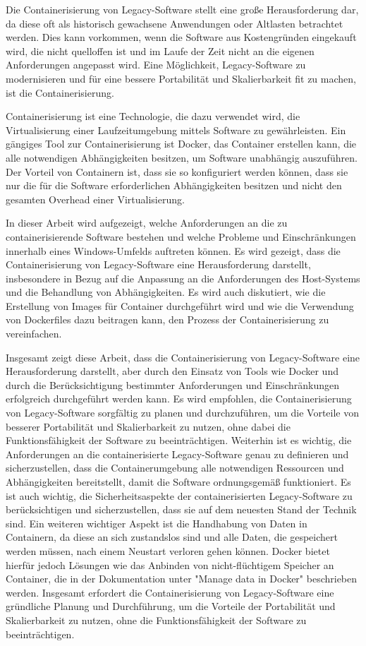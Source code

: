 Die Containerisierung von Legacy-Software stellt eine große Herausforderung dar, da diese oft als historisch gewachsene Anwendungen oder Altlasten betrachtet werden. Dies kann vorkommen, wenn die Software aus Kostengründen eingekauft wird, die nicht quelloffen ist und im Laufe der Zeit nicht an die eigenen Anforderungen angepasst wird. Eine Möglichkeit, Legacy-Software zu modernisieren und für eine bessere Portabilität und Skalierbarkeit fit zu machen, ist die Containerisierung.

Containerisierung ist eine Technologie, die dazu verwendet wird, die Virtualisierung einer Laufzeitumgebung mittels Software zu gewährleisten. Ein gängiges Tool zur Containerisierung ist Docker, das Container erstellen kann, die alle notwendigen Abhängigkeiten besitzen, um Software unabhängig auszuführen. Der Vorteil von Containern ist, dass sie so konfiguriert werden können, dass sie nur die für die Software erforderlichen Abhängigkeiten besitzen und nicht den gesamten Overhead einer Virtualisierung.

In dieser Arbeit wird aufgezeigt, welche Anforderungen an die zu containerisierende Software bestehen und welche Probleme und Einschränkungen innerhalb eines Windows-Umfelds auftreten können. Es wird gezeigt, dass die Containerisierung von Legacy-Software eine Herausforderung darstellt, insbesondere in Bezug auf die Anpassung an die Anforderungen des Host-Systems und die Behandlung von Abhängigkeiten. Es wird auch diskutiert, wie die Erstellung von Images für Container durchgeführt wird und wie die Verwendung von Dockerfiles dazu beitragen kann, den Prozess der Containerisierung zu vereinfachen.

Insgesamt zeigt diese Arbeit, dass die Containerisierung von Legacy-Software eine Herausforderung darstellt, aber durch den Einsatz von Tools wie Docker und durch die Berücksichtigung bestimmter Anforderungen und Einschränkungen erfolgreich durchgeführt werden kann. Es wird empfohlen, die Containerisierung von Legacy-Software sorgfältig zu planen und durchzuführen, um die Vorteile von besserer Portabilität und Skalierbarkeit zu nutzen, ohne dabei die Funktionsfähigkeit der Software zu beeinträchtigen. Weiterhin ist es wichtig, die Anforderungen an die containerisierte Legacy-Software genau zu definieren und sicherzustellen, dass die Containerumgebung alle notwendigen Ressourcen und Abhängigkeiten bereitstellt, damit die Software ordnungsgemäß funktioniert. Es ist auch wichtig, die Sicherheitsaspekte der containerisierten Legacy-Software zu berücksichtigen und sicherzustellen, dass sie auf dem neuesten Stand der Technik sind. Ein weiteren wichtiger Aspekt ist die Handhabung von Daten in Containern, da diese an sich zustandslos sind und alle Daten, die gespeichert werden müssen, nach einem Neustart verloren gehen können. Docker bietet hierfür jedoch Lösungen wie das Anbinden von nicht-flüchtigem Speicher an Container, die in der Dokumentation unter "Manage data in Docker"  beschrieben werden. Insgesamt erfordert die Containerisierung von Legacy-Software eine gründliche Planung und Durchführung, um die Vorteile der Portabilität und Skalierbarkeit zu nutzen, ohne die Funktionsfähigkeit der Software zu beeinträchtigen.
